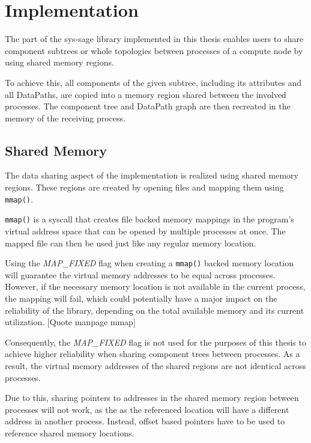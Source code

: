 
\chapter{Implementation}\label{chapter:Implementation}

The part of the sys-sage library implemented in this thesis enables users to share component subtrees or whole topologies between processes of a compute node by using shared memory regions.

To achieve this, all components of the given subtree, including its attributes and all DataPaths, are copied into a memory region shared between the involved processes.
The component tree and DataPath graph are then recreated in the memory of the receiving process.

\section{Shared Memory}
The data sharing aspect of the implementation is realized using shared memory regions. These regions are created by opening files and mapping them using \lstinline{mmap()}.

\lstinline{mmap()} is a syscall that creates file backed memory mappings in the program's virtual address space that can be opened by multiple processes at once.
The mapped file can then be used just like any regular memory location. \cite{crotty22-mmap}

Using the \emph{MAP\_FIXED} flag when creating a \lstinline{mmap()} backed memory location will guarantee the virtual memory addresses to be equal across processes.
However, if the necessary memory location is not available in the current process, the mapping will fail, which could potentially have a major impact on the reliability of the library,
depending on the total available memory and its current utilization. [Quote manpage mmap] %

Consequently, the \emph{MAP\_FIXED} flag is not used for the purposes of this thesis to achieve higher reliability when sharing component trees between processes.
As a result, the virtual memory addresses of the shared regions are not identical across processes.

Due to this, sharing pointers to addresses in the shared memory region between processes will not work, as the as the referenced location will have a different address in another process.
Instead, offset based pointers have to be used to reference shared memory locations.

